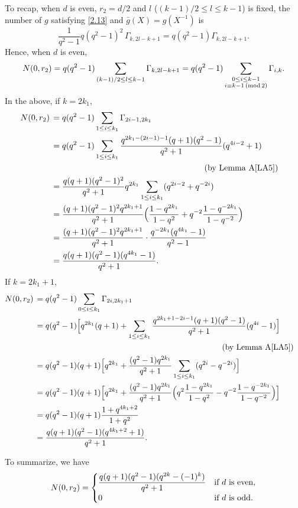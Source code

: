 \documentclass{amsart}
\numberwithin{equation}{section}
\theoremstyle{definition}
\begin{document}
To recap, when $d$ is even, $r_2=d/2$ and $l$ ($(k-1)/2\le l\le k-1$) is fixed, the number of $g$ satisfying \eqref{2.13} and $\bar g(X)=g(X^{-1})$ is
\[
\frac 1{q^2-1}q(q^2-1)^2\,\Gamma_{k,2l-k+1}=q(q^2-1)\Gamma_{k,2l-k+1}.
\]
Hence, when $d$ is even, 
\[
N(0,r_2)=q(q^2-1)\sum_{(k-1)/2\le l\le k-1}\Gamma_{k,2l-k+1}=q(q^2-1)\sum_{\substack{0\le i\le k-1\cr i\equiv k-1\,(\text{mod}\,2)}}\Gamma_{i,k}.
\]
In the above, if $k=2k_1$, 
\begin{align*}
N(0,r_2)\,&=q(q^2-1)\sum_{1\le i\le k_1}\Gamma_{2i-1,2k_1}\cr
&=q(q^2-1)\sum_{1\le i\le k_1}\frac{q^{2k_1-(2i-1)-1}(q+1)(q^2-1)}{q^2+1}(q^{4i-2}+1)\cr
&\kern18.5em \text{(by Lemma~A\ref{LA5})}\cr
&=\frac{q(q+1)(q^2-1)^2}{q^2+1}q^{2k_1}\sum_{1\le i\le k_1}(q^{2i-2}+q^{-2i})\cr
&=\frac{(q+1)(q^2-1)^2 q^{2k_1+1}}{q^2+1}\Bigl(\frac{1-q^{2k_1}}{1-q^2}+q^{-2}\frac{1-q^{-2k_1}}{1-q^{-2}}\Bigr)\cr
&=\frac{(q+1)(q^2-1)^2 q^{2k_1+1}}{q^2+1}\cdot\frac{q^{-2k_1}(q^{4k_1}-1)}{q^2-1}\cr
&=\frac{q(q+1)(q^2-1)(q^{4k_1}-1)}{q^2+1}.
\end{align*}
If $k=2k_1+1$,
\begin{align*}
N(0,r_2)\,&=q(q^2-1)\sum_{0\le i\le k_1}\Gamma_{2i,2k_1+1}\cr
&=q(q^2-1)\Bigl[q^{2k_1}(q+1)+\sum_{1\le i\le k_1}\frac{q^{2k_1+1-2i-1}(q+1)(q^2-1)}{q^2+1}(q^{4i}-1)\Bigr]\cr
&\kern23.3em \text{(by Lemma~A\ref{LA5})}\cr
&=q(q^2-1)(q+1)\Bigl[q^{2k_1}+\frac{(q^2-1)q^{2k_1}}{q^2+1}\sum_{1\le i\le k_1}(q^{2i}-q^{-2i})\Bigr]\cr
&=q(q^2-1)(q+1)\Bigl[q^{2k_1}+\frac{(q^2-1)q^{2k_1}}{q^2+1}\Bigl(q^2\frac{1-q^{2k_1}}{1-q^2}-q^{-2}\frac{1-q^{-2k_1}}{1-q^{-2}}\Bigr)\Bigr]\cr
&=q(q^2-1)(q+1)\frac{1+q^{4k_1+2}}{1+q^2}\cr
&=\frac{q(q+1)(q^2-1)(q^{4k_1+2}+1)}{q^2+1}.
\end{align*}

To summarize, we have
\begin{equation}\label{case2}
N(0,r_2)=\begin{cases}
\displaystyle \frac{q(q+1)(q^2-1)(q^{2k}-(-1)^k)}{q^2+1}&\text{if $d$ is even},\cr
0&\text{if $d$ is odd}.
\end{cases}
\end{equation}
\end{document}
